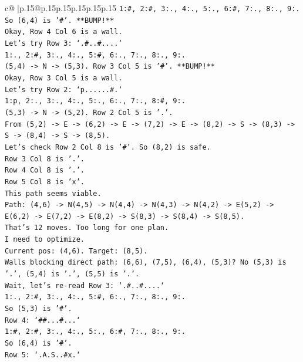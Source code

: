 \documentclass{article}
\begin{document}
{\begin{supertabular}{c@{$\;$}|p{.15\linewidth}@{}p{.15\linewidth}p{.15\linewidth}p{.15\linewidth}p{.15\linewidth}p{.15\linewidth}}
{{{\texttt{1:\#, 2:\#, 3:., 4:., 5:., 6:\#, 7:., 8:., 9:.} \\
\texttt{So (6,4) is '\#'. **BUMP!**} \\
\texttt{Okay, Row 4 Col 6 is a wall.} \\
\texttt{Let's try Row 3: `.\#..\#....`} \\
\texttt{1:., 2:\#, 3:., 4:., 5:\#, 6:., 7:., 8:., 9:.} \\
\texttt{(5,4) {-}> N {-}> (5,3). Row 3 Col 5 is '\#'. **BUMP!**} \\
\texttt{Okay, Row 3 Col 5 is a wall.} \\
\texttt{Let's try Row 2: `p......\#.`} \\
\texttt{1:p, 2:., 3:., 4:., 5:., 6:., 7:., 8:\#, 9:.} \\
\texttt{(5,3) {-}> N {-}> (5,2). Row 2 Col 5 is '.'.} \\
\texttt{From (5,2) {-}> E {-}> (6,2) {-}> E {-}> (7,2) {-}> E {-}> (8,2) {-}> S {-}> (8,3) {-}> S {-}> (8,4) {-}> S {-}> (8,5).} \\
\texttt{Let's check Row 2 Col 8 is '\#'. So (8,2) is safe.} \\
\texttt{Row 3 Col 8 is '.'.} \\
\texttt{Row 4 Col 8 is '.'.} \\
\texttt{Row 5 Col 8 is 'x'.} \\
\texttt{This path seems viable.} \\
\texttt{Path: (4,6) {-}> N(4,5) {-}> N(4,4) {-}> N(4,3) {-}> N(4,2) {-}> E(5,2) {-}> E(6,2) {-}> E(7,2) {-}> E(8,2) {-}> S(8,3) {-}> S(8,4) {-}> S(8,5).} \\
\texttt{That's 12 moves. Too long for one plan.} \\
\texttt{I need to optimize.} \\
\texttt{Current pos: (4,6). Target: (8,5).} \\
\texttt{Walls blocking direct path: (6,6), (7,5), (6,4), (5,3)? No (5,3) is '.', (5,4) is '.', (5,5) is '.'.} \\
\texttt{Wait, let's re{-}read Row 3: `.\#..\#....`} \\
\texttt{1:., 2:\#, 3:., 4:., 5:\#, 6:., 7:., 8:., 9:.} \\
\texttt{So (5,3) is '\#'.} \\
\texttt{Row 4: `\#\#...\#...`} \\
\texttt{1:\#, 2:\#, 3:., 4:., 5:., 6:\#, 7:., 8:., 9:.} \\
\texttt{So (6,4) is '\#'.} \\
\texttt{Row 5: `.A.S..\#x.`} \\
}}}
\end{supertabular}}
\end{document}
